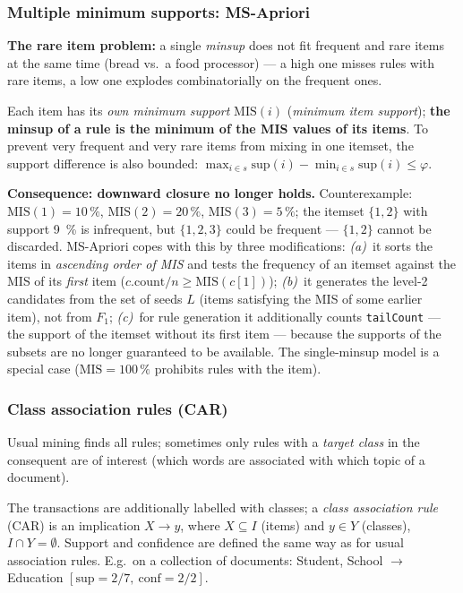 \documentclass[11pt,a4paper]{article}
\theoremstyle{definition}
\begin{document}
\subsubsection{Multiple minimum supports: MS-Apriori}

\textbf{The rare item problem:} a single \emph{minsup} does not fit frequent and rare items at
the same time (bread vs.\ a food processor) --- a high one misses rules with rare items, a low
one explodes combinatorially on the frequent ones.

\begin{defbox}
Each item has its \emph{own minimum support} $\mathrm{MIS}(i)$ (\emph{minimum item support});
\textbf{the minsup of a rule is the minimum of the MIS values of its items}. To prevent very
frequent and very rare items from mixing in one itemset, the support difference is also
bounded: $\max_{i\in s}\mathrm{sup}(i)-\min_{i\in s}\mathrm{sup}(i)\le\varphi$.
\end{defbox}

\textbf{Consequence: downward closure no longer holds.} Counterexample:
$\mathrm{MIS}(1)=10\,\%$, $\mathrm{MIS}(2)=20\,\%$, $\mathrm{MIS}(3)=5\,\%$; the itemset
$\{1,2\}$ with support 9~\% is infrequent, but $\{1,2,3\}$ could be frequent --- $\{1,2\}$
cannot be discarded. MS-Apriori copes with this by three modifications: \emph{(a)}~it sorts
the items in \emph{ascending order of MIS} and tests the frequency of an itemset against the
MIS of its \emph{first} item ($c.\mathrm{count}/n\ge\mathrm{MIS}(c[1])$); \emph{(b)}~it
generates the level-2 candidates from the set of seeds $L$ (items satisfying the MIS of some
earlier item), not from $F_1$; \emph{(c)}~for rule generation it additionally counts
\texttt{tailCount} --- the support of the itemset without its first item --- because the
supports of the subsets are no longer guaranteed to be available. The single-minsup model is a
special case ($\mathrm{MIS}=100\,\%$ prohibits rules with the item).

\subsubsection{Class association rules (CAR)}

Usual mining finds all rules; sometimes only rules with a \emph{target class} in the
consequent are of interest (which words are associated with which topic of a document).

\begin{defbox}
The transactions are additionally labelled with classes; a \emph{class association rule}
(CAR) is an implication $X\to y$, where $X\subseteq I$ (items) and $y\in Y$ (classes),
$I\cap Y=\emptyset$. Support and confidence are defined the same way as for usual association
rules. E.g.\ on a collection of documents:
Student, School $\to$ Education $[\mathrm{sup}=2/7,\ \mathrm{conf}=2/2]$.
\end{defbox}
\end{document}
